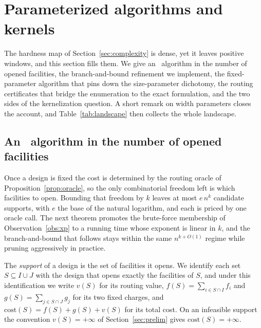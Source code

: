 \section{Parameterized algorithms and kernels}\label{sec:algorithms}

The hardness map of Section~\ref{sec:complexity} is dense, yet it leaves
positive windows, and this section fills them. We give an \XP\ algorithm
in the number of opened facilities, the branch-and-bound
refinement we implement, the fixed-parameter algorithm that pins down the
size-parameter dichotomy, the routing certificates that bridge the
enumeration to the exact formulation, and the two sides of the
kernelization question. A short remark on width parameters closes the
account, and Table~\ref{tab:landscape} then collects the whole landscape.

\subsection{An \XP\ algorithm in the number of opened
facilities}\label{sec:xp}

Once a design is fixed the cost is determined by the routing oracle of
Proposition~\ref{prop:oracle}, so the only combinatorial freedom left is
which facilities to open. Bounding that freedom by $k$ leaves at most
$e\,n^{k}$ candidate supports, with $e$ the base of the natural
logarithm, and each is priced by one oracle call.
The next theorem promotes the brute-force membership of
Observation~\ref{obs:xp} to a running time whose exponent is linear in
$k$, and the branch-and-bound that follows stays within the same
$n^{k+O(1)}$ regime while pruning aggressively in practice.

The \emph{support} of a design is the set of facilities it opens. We
identify each set $S\subseteq I\cup J$ with the design that opens exactly
the facilities of $S$, and under this identification we write $v(S)$ for
its routing value, $f(S)=\sum_{i\in S\cap I}f_i$ and
$g(S)=\sum_{j\in S\cap J}g_j$ for its two fixed charges, and
$\mathrm{cost}(S)=f(S)+g(S)+v(S)$ for its total cost. On an infeasible
support the convention $v(S)=+\infty$ of Section~\ref{sec:prelim}
gives $\mathrm{cost}(S)=+\infty$.


